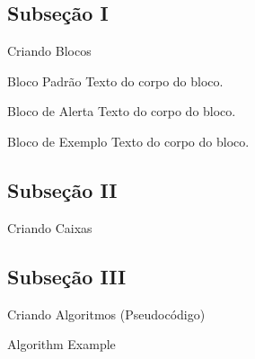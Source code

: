 \documentclass{libs/ufc_format}
\begin{document}
\subsection{Subseção I}
\begin{frame}{Criando Blocos}
    \begin{block}{Bloco Padrão}
        Texto do corpo do bloco.
    \end{block}

    \begin{alertblock}{Bloco de Alerta}
        Texto do corpo do bloco.
    \end{alertblock}

    \begin{exampleblock}{Bloco de Exemplo}
        Texto do corpo do bloco.
    \end{exampleblock}   
\end{frame}

\subsection{Subseção II}
\begin{frame}{Criando Caixas}

    \pause


    \pause

\end{frame}

\subsection{Subseção III}
\begin{frame}{Criando Algoritmos (Pseudocódigo)}
    \begin{algorithm}[H]
        \SetAlgoLined
        \LinesNumbered
         \caption{Algorithm Example}
    \end{algorithm}
\end{frame}
\end{document}
